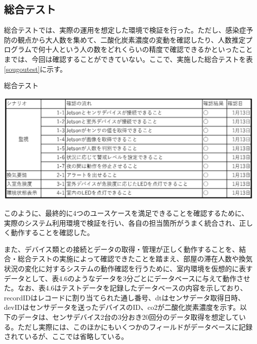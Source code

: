 \subsection{総合テスト}
総合テストでは、実際の運用を想定した環境で検証を行った。ただし、感染症予防の観点から大人数を集めて、二酸化炭素濃度の変動を確認したり、人数推定プログラムで何十人という人の数をどれくらいの精度で確認できるかといったことまでは、今回は確認することができていない。ここで、実施した総合テストを表\ref{sougoutest}に示す。

\begin{table}[H]
	\centering
	\caption{総合テスト}
	\includegraphics[width=15cm]{sougoutest.eps}
	\label{sougoutest}
\end{table}

このように、最終的に4つのユースケースを満足できることを確認するために、実際のシステム利用環境で検証を行い、各自の担当箇所がうまく統合され、正しく動作することを確認した。

また、デバイス類との接続とデータの取得・管理が正しく動作することを、結合・総合テストの実施によって確認できたことを踏まえ、部屋の滞在人数や換気状況の変化に対するシステムの動作確認を行うために、室内環境を仮想的に表すデータとして、表4.6のようなデータを3分ごとにデータベースに与えて動作させた。なお、表4.6はテストデータを記録したデータベースの内容を示しており、recordIDはレコードに割り当てられた通し番号、dtはセンサデータ取得日時、devIDはセンサデータを送ったデバイスのID、co2が二酸化炭素濃度を示す。以下のデータは、センサデバイス2台の3分おき20回分のデータ取得を想定している。ただし実際には、このほかにもいくつかのフィールドがデータベースに記録されているが、ここでは省略している。


